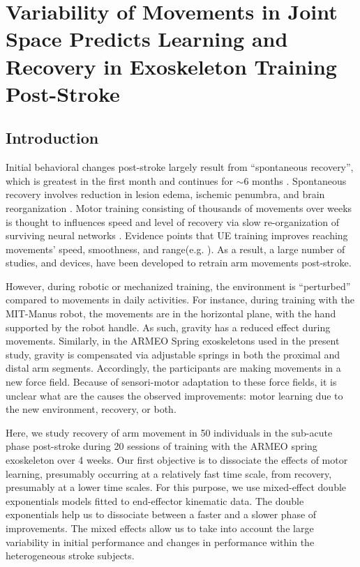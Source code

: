 \chapter{Variability of Movements in Joint Space Predicts Learning and Recovery	in Exoskeleton Training Post-Stroke}
\label{cha:armeospring}


\section{Introduction}

Initial behavioral changes post-stroke largely result from “spontaneous recovery”, which is greatest in the first month and continues for $ \sim $6 months \cite{Duncan1992, Duncan2000}. 
Spontaneous recovery involves reduction in lesion edema, ischemic penumbra, and brain reorganization \cite{Bains2014, Murphy2009}. 
Motor training consisting of thousands of movements over weeks is thought to influences speed and level of recovery via slow re-organization of surviving neural networks \cite{Nudo1996, Pavlides1993, Wolf2006, Lincoln1996}. 
Evidence points that UE training improves reaching movements’ speed, smoothness, and range(e.g. \cite{Anton1996}).
As a result, a large number of studies, and devices, have been developed to retrain arm movements post-stroke. 

However, during robotic or mechanized training, the environment is “perturbed” compared to movements in daily activities. 
For instance, during training with the MIT-Manus robot, the movements are in the horizontal plane, with the hand supported by the robot handle. 
As such, gravity has a reduced effect during movements. 
Similarly, in the ARMEO Spring exoskeletons used in the present study, gravity is compensated via adjustable springs in both the proximal and distal arm segments.
Accordingly, the participants are making movements in a new force field. 
Because of sensori-motor adaptation to these force fields, it is unclear what are the causes the observed improvements: motor learning due to the new environment, recovery, or both. 

Here, we study recovery of arm movement in 50 individuals in the sub-acute phase post-stroke during 20 sessions of training with the ARMEO spring exoskeleton over 4 weeks.
Our first objective is to dissociate the effects of motor learning, presumably occurring at a relatively fast time scale, from recovery, presumably at a lower time scales.  
For this purpose, we use mixed-effect double exponentials models fitted to end-effector kinematic data. 
The double exponentials help us to dissociate between a faster and a slower phase of improvements. 
The mixed effects allow us to take into account the large variability in initial performance and changes in performance within the heterogeneous stroke subjects.

